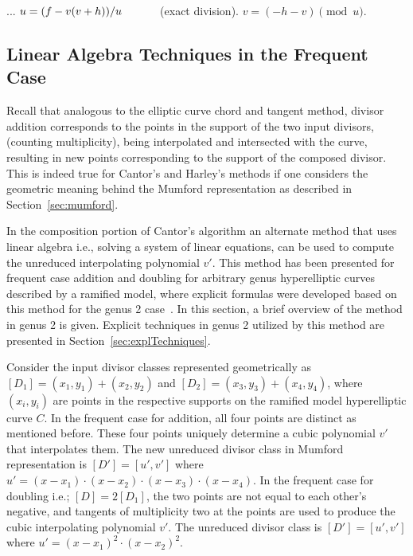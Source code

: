 \begin{center}
  \begin{minipage}{0.60\textwidth}
  \begin{algorithm}[H]
      \caption{Harley's Method Continued for Genus 3}
      \label{alg:harleyg3}
      \centering
      \begin{algorithmic}[1]
          \vspace{5pt}
          \Statex ...
          \State $u = (f - v(v + h))/u \quad\quad\quad$ (exact division). 
          \State $v = (-h - v)\pmod{u}$.
          \vspace{1pt}
      \end{algorithmic}
  \end{algorithm}
  \end{minipage}
\end{center}

\subsection{Linear Algebra Techniques in the Frequent Case} \label{sec:geometric} 
Recall that analogous to the elliptic curve chord and tangent method, divisor
addition corresponds to the points in the support of the two input divisors,
(counting multiplicity), being interpolated and intersected with the curve,
resulting in new points corresponding to the support of the composed divisor.
This is indeed true for Cantor's and Harley's methods if one considers the
geometric meaning behind the Mumford representation as described in
Section~\ref{sec:mumford}. 

In the composition portion of Cantor's algorithm an alternate method that uses
linear algebra i.e., solving a system of linear equations, can be used to
compute the unreduced interpolating polynomial $v'$. This method has been
presented for frequent case addition and doubling for arbitrary genus
hyperelliptic curves described by a ramified model, where explicit formulas
were developed based on this method for the genus 2
case~\cite{CostelloLauter_geo_2011}.  In this section, a brief overview of the
method in genus 2 is given. Explicit techniques in genus 2 utilized by this
method are presented in Section~\ref{sec:explTechniques}.

Consider the input divisor classes represented geometrically as $[D_1] = (x_1,
y_1) + (x_2, y_2)$ and $[D_2] = (x_3, y_3) + (x_4, y_4)$, where $(x_i, y_i)$ are
points in the respective supports on the ramified model
hyperelliptic curve $C$. In the frequent case for addition, all four points are
distinct as mentioned before. These four points uniquely determine a cubic
polynomial $v'$ that interpolates them. The new unreduced divisor class in
Mumford representation is $[D'] = [u',v']$ where $u' = (x-x_1) \cdot (x-x_2)
\cdot (x-x_3) \cdot (x-x_4)$. In the frequent case for doubling i.e.; $[D]=
2[D_1]$, the two points are not equal to each other's negative, and tangents of
multiplicity two at the points are used to produce the cubic interpolating
polynomial $v'$. The unreduced divisor class is $[D'] = [u',v']$ where $ u' =
(x-x_1)^2 \cdot (x-x_2)^2$. 

